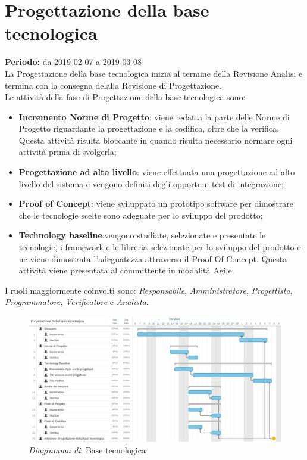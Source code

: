 \section{Progettazione della base tecnologica}
\textbf{Periodo:} da 2019-02-07 a 2019-03-08\\
La Progettazione della base tecnologica inizia al termine della Revisione Analisi e termina con la consegna delalla Revisione di Progettazione.\\
Le attività della fase di Progettazione della base tecnologica sono:
\begin{itemize}
	\item \textbf{Incremento Norme di Progetto}: viene redatta la parte delle Norme di Progetto riguardante la progettazione e la codifica, oltre che la verifica. Questa attività risulta bloccante in quando risulta necessario normare ogni attività prima di svolgerla;
	\item \textbf{Progettazione ad alto livello}: viene effettuata una progettazione ad alto livello del sistema e vengono definiti degli opportuni test di integrazione;
	\item \textbf{Proof of Concept}: viene sviluppato un prototipo software per dimostrare che le tecnologie scelte sono adeguate per lo sviluppo del prodotto;
    \item\textbf{Technology baseline}:vengono studiate, selezionate e presentate le tecnologie, i framework e le libreria selezionate per lo sviluppo del prodotto e ne viene dimostrata l'adeguatezza attraverso il Proof Of Concept. Questa attività viene presentata al committente in modalità Agile.
\end{itemize}
I ruoli maggiormente coinvolti sono: \textit{Responsabile}, \textit{Amministratore}, \textit{Progettista}, \textit{Programmatore}, \textit{Verificatore} e \textit{Analista}.
\begin{figure} [h]
    \centering
    \includegraphics[scale=0.13]{./images/base_tecnologica.jpg}
    \caption{\textit{Diagramma di}: Base tecnologica }\label{}
\end{figure}
\newpage
